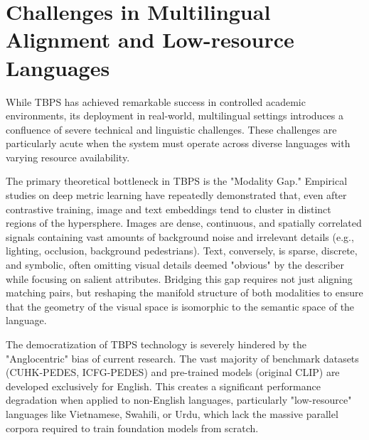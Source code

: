 \documentclass[../main.tex]{subfiles}
\begin{document}
\section{Challenges in Multilingual Alignment and Low-resource Languages}

While TBPS has achieved remarkable success in controlled academic environments, its deployment in real-world, multilingual settings introduces a confluence of severe technical and linguistic challenges. These challenges are particularly acute when the system must operate across diverse languages with varying resource availability.

The primary theoretical bottleneck in TBPS is the "Modality Gap." Empirical studies on deep metric learning have repeatedly demonstrated that, even after contrastive training, image and text embeddings tend to cluster in distinct regions of the hypersphere. Images are dense, continuous, and spatially correlated signals containing vast amounts of background noise and irrelevant details (e.g., lighting, occlusion, background pedestrians). Text, conversely, is sparse, discrete, and symbolic, often omitting visual details deemed "obvious" by the describer while focusing on salient attributes. Bridging this gap requires not just aligning matching pairs, but reshaping the manifold structure of both modalities to ensure that the geometry of the visual space is isomorphic to the semantic space of the language.

The democratization of TBPS technology is severely hindered by the "Anglocentric" bias of current research. The vast majority of benchmark datasets (CUHK-PEDES, ICFG-PEDES) and pre-trained models (original CLIP) are developed exclusively for English. This creates a significant performance degradation when applied to non-English languages, particularly "low-resource" languages like Vietnamese, Swahili, or Urdu, which lack the massive parallel corpora required to train foundation models from scratch.
\end{document}

